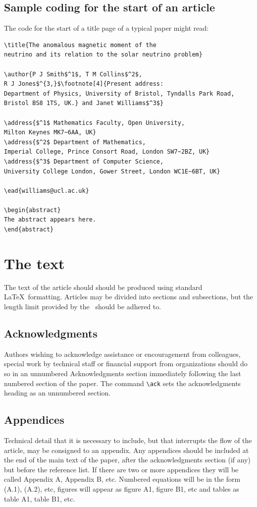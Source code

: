 \documentclass[a4paper]{jpconf}
\begin{document}
\subsection{Sample coding for the start of an article}
\label{startsample}
The code for the start of a title page of a typical paper might read:
\begin{verbatim}
\title{The anomalous magnetic moment of the
neutrino and its relation to the solar neutrino problem}

\author{P J Smith$^1$, T M Collins$^2$,
R J Jones$^{3,}$\footnote[4]{Present address:
Department of Physics, University of Bristol, Tyndalls Park Road,
Bristol BS8 1TS, UK.} and Janet Williams$^3$}

\address{$^1$ Mathematics Faculty, Open University,
Milton Keynes MK7~6AA, UK}
\address{$^2$ Department of Mathematics,
Imperial College, Prince Consort Road, London SW7~2BZ, UK}
\address{$^3$ Department of Computer Science,
University College London, Gower Street, London WC1E~6BT, UK}

\ead{williams@ucl.ac.uk}

\begin{abstract}
The abstract appears here.
\end{abstract}
\end{verbatim}

\section{The text}
The text of the article should should be produced using standard \LaTeX\ formatting. Articles may be divided into sections and subsections, but the length limit provided by the \corg\ should be adhered to.

\subsection{Acknowledgments}
Authors wishing to acknowledge assistance or encouragement from
colleagues, special work by technical staff or financial support from
organizations should do so in an unnumbered Acknowledgments section
immediately following the last numbered section of the paper. The
command \verb"\ack" sets the acknowledgments heading as an unnumbered
section.

\subsection{Appendices}
Technical detail that it is necessary to include, but that interrupts
the flow of the article, may be consigned to an appendix.
Any appendices should be included at the end of the main text of the paper, after the acknowledgments section (if any) but before the reference list.
If there are two or more appendices they will be called Appendix A, Appendix B, etc.
Numbered equations will be in the form (A.1), (A.2), etc,
figures will appear as figure A1, figure B1, etc and tables as table A1,
table B1, etc.
\end{document}
